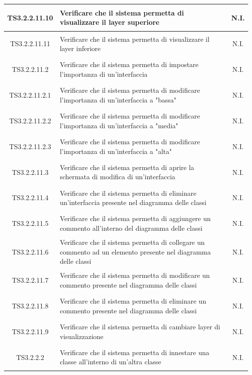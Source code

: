\documentclass[../PianoDiQualifica.tex]{subfiles}
\begin{document}
\begin{longtable}{|c|>{\centering}p{10cm}|c|}
	\hline
	\hypertarget{TS3.2.2.11.10}{TS3.2.2.11.10} & Verificare che il sistema permetta di visualizzare il layer superiore & N.I. \\
	\hline
	\hypertarget{TS3.2.2.11.11}{TS3.2.2.11.11} & Verificare che il sistema permetta di visualizzare il layer inferiore & N.I. \\
	\hline
	\hypertarget{TS3.2.2.11.2}{TS3.2.2.11.2} & Verificare che il sistema permetta di impostare l'importanza di un'interfaccia & N.I. \\
	\hline
	\hypertarget{TS3.2.2.11.2.1}{TS3.2.2.11.2.1} & Verificare che il sistema permetta di modificare l'importanza di un'interfaccia a "bassa" & N.I. \\
	\hline
	\hypertarget{TS3.2.2.11.2.2}{TS3.2.2.11.2.2} & Verificare che il sistema permetta di modificare l'importanza di un'interfaccia a "media" & N.I. \\
	\hline
	\hypertarget{TS3.2.2.11.2.3}{TS3.2.2.11.2.3} & Verificare che il sistema permetta di modificare l'importanza di un'interfaccia a "alta" & N.I. \\
	\hline
	\hypertarget{TS3.2.2.11.3}{TS3.2.2.11.3} & Verificare che il sistema permetta di aprire la schermata di modifica di un'interfaccia & N.I. \\
	\hline
	\hypertarget{TS3.2.2.11.4}{TS3.2.2.11.4} & Verificare che il sistema permetta di eliminare un'interfaccia presente nel diagramma delle classi & N.I. \\
	\hline
	\hypertarget{TS3.2.2.11.5}{TS3.2.2.11.5} & Verificare che il sistema permetta di aggiungere un commento all'interno del diagramma delle classi & N.I. \\
	\hline
	\hypertarget{TS3.2.2.11.6}{TS3.2.2.11.6} & Verificare che il sistema permetta di collegare un commento ad un elemento presente nel diagramma delle classi & N.I. \\
	\hline
	\hypertarget{TS3.2.2.11.7}{TS3.2.2.11.7} & Verificare che il sistema permetta di modificare un commento presente nel diagramma delle classi & N.I. \\
	\hline
	\hypertarget{TS3.2.2.11.8}{TS3.2.2.11.8} & Verificare che il sistema permetta di eliminare un commento presente nel diagramma delle classi & N.I. \\
	\hline
	\hypertarget{TS3.2.2.11.9}{TS3.2.2.11.9} & Verificare che il sistema permetta di cambiare layer di visualizzazione & N.I. \\
	\hline
	\hypertarget{TS3.2.2.2}{TS3.2.2.2} & Verificare che il sistema permetta di innestare una classe all'interno di un'altra classe & N.I. \\

\end{longtable}
\end{document}
